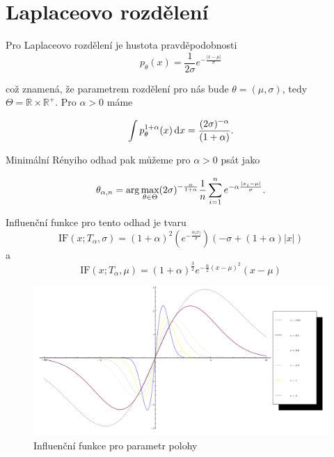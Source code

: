 \section{Laplaceovo rozdělení}

Pro Laplaceovo rozdělení je hustota pravděpodobnosti
\begin{equation}
	p_{\theta}(x)  = \frac{1}{2\sigma} e^{ -\frac{| x-\mu |}{\sigma}  } 
\end{equation}

což znamená, že parametrem rozdělení pro nás bude $\theta = (\mu,\sigma)$, tedy $\Theta = \mathbb{R} \times \mathbb{R}^+ $. Pro $\alpha > 0 $ máme 

\begin{equation}
		\int p_\theta^{1+\alpha}(x) \, \mathrm{d}x	= \frac{(2\sigma)^{-\alpha}}{(1+\alpha)}. 
\end{equation}

Minimální Rényiho odhad pak můžeme pro $\alpha>0$ psát jako

\begin{equation}
	\theta_{\alpha,n} = \arg \max_{\theta \in \Theta} (2\sigma)^{-\frac{\alpha}{1+\alpha}} \frac{1}{n} \sum_{i=1}^n e^{-\alpha\frac{| x_i-\mu |}{\sigma}}. 
\end{equation}

Influenční funkce pro tento odhad je tvaru 
\begin{equation}
	\mathrm{IF}(x;T_{\alpha},\sigma) = (1 + \alpha)^2 \left( e^{-\frac{\alpha|x|}{\sigma}}\right) \left(-\sigma + (1 + \alpha)|x|\right)	
\end{equation}
a
\begin{equation}
	\mathrm{IF}(x;T_{\alpha},\mu) =(1+\alpha )^{\frac{3}{2}} e^{-\frac{\alpha}{2} (x-\mu )^2}  (x-\mu )
\end{equation}

\begin{figure}[htb]
  \centering
    \includegraphics[scale=0.30]{IF-Laplace-mu.png}
          \caption{Influenční funkce pro parametr polohy}
    \label{fig:IF-Laplace-mu}
\end{figure}

